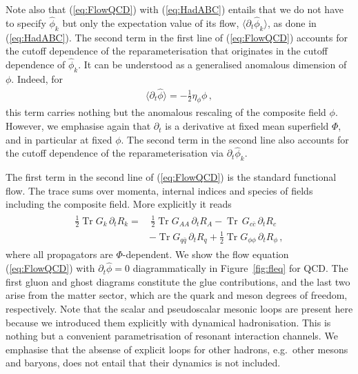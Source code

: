 \documentclass[%
reprint,
superscriptaddress,
showpacs,preprintnumbers,
 amsmath,amssymb,
 aps,
prd,
]{revtex4-1}
\newcommand{\Tr}{\ensuremath{\operatorname{Tr}}}
\def\Fig#1{Figure~\ref{#1}}
\def\eq#1{(\ref{#1})}
\begin{document}
Note also that \eq{eq:FlowQCD} with \eq{eq:HadABC} entails that we do
not have to specify $\hat \phi_k$ but only the expectation value of
its flow, $\langle \partial_t \hat\phi_k\rangle $, as done in
\eq{eq:HadABC}. The second term in the first line of \eq{eq:FlowQCD}
accounts for the cutoff dependence of the reparameterisation that
originates in the cutoff dependence of $\hat\phi_k$. It can be
understood as a generalised anomalous dimension of $\phi$. Indeed, for
%
\begin{align}\label{eq:GenAn}
  \langle\partial_t \hat\phi\rangle = -\frac12  \eta_\phi \phi\,, 
\end{align}
%
this term carries nothing but the anomalous rescaling of the composite
field $\phi$. However, we emphasise again that $\partial_t$ is a
derivative at fixed mean superfield $\Phi$, and in particular at fixed
$\phi$. The second term in the second line also accounts for the
cutoff dependence of the reparameterisation via
$\partial_t \hat \phi_k$.

The first term in the second line of \eq{eq:FlowQCD} is the standard
functional flow. The trace sums over momenta, internal indices and
species of fields including the composite field. More explicitly it
reads
%
\begin{align}\label{eq:FullProp}
\begin{split}
  \frac12 \Tr G_k\,\partial_t R_k=&\,
  \frac12 \Tr G_{AA} \,\partial_t R_A -\Tr\, G_{c\bar c} \,\partial_t R_c\\[1ex]
  &-
     \Tr G_{q\bar q}\,\partial_t R_q+ \frac{1}{2}\Tr
                                 G_{\phi\phi}\, \partial_{t} R_{\phi} \,, 
\end{split}
\end{align}
where all propagators are $\Phi$-dependent.  We show the flow equation
\eq{eq:FlowQCD} with $\partial_t \hat \phi=0$ diagrammatically in
\Fig{fig:fleq} for QCD. The first gluon and ghost diagrams constitute
the glue contributions, and the last two arise from the matter sector,
which are the quark and meson degrees of freedom,
respectively. Note that the scalar and pseudoscalar mesonic
  loops are present here because we introduced them explicitly with
  dynamical hadronisation. This is nothing but a convenient
  parametrisation of resonant interaction channels. We emphasise that
  the absense of explicit loops for other hadrons, e.g.\ other mesons
  and baryons, does not entail that their dynamics is not included.



\end{document}
